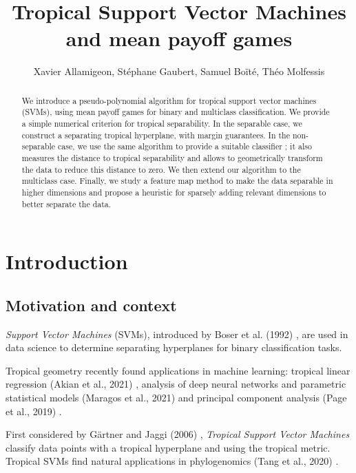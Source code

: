 \documentclass[oneside,UKenglish,a4paper]{amsart}
\numberwithin{equation}{section}
\numberwithin{figure}{section}
\theoremstyle{plain}
\theoremstyle{definition}
\theoremstyle{plain}
\theoremstyle{remark}
\theoremstyle{plain}
\theoremstyle{definition}
\theoremstyle{definition}
\begin{document}
\title{Tropical Support Vector Machines and mean payoff games}
\author{Xavier Allamigeon, Stéphane Gaubert, Samuel Boïté, Théo Molfessis}
\maketitle

\begin{abstract}
    We introduce a pseudo-polynomial algorithm for tropical support vector machines (SVMs), using mean payoff games for binary and multiclass classification. We provide a simple numerical criterion for tropical separability. In the separable case, we construct a separating tropical hyperplane, with margin guarantees. In the non-separable case, we use the same algorithm to provide a suitable classifier ; it also measures the distance to tropical separability and allows to geometrically transform the data to reduce this distance to zero. We then extend our algorithm to the multiclass case. Finally, we study a feature map method to make the data separable in higher dimensions and propose a heuristic for sparsely adding relevant dimensions to better separate the data. 
\end{abstract}


\section{Introduction}

\subsection*{Motivation and context}
\emph{Support Vector Machines} (SVMs), introduced by Boser et al. (1992) \cite{Boser92}, are used in data science to determine separating hyperplanes for binary classification tasks.

Tropical geometry recently found applications in machine learning: tropical linear regression (Akian et al., 2021) \cite{Akian2021TropicalLR}, analysis of deep neural networks and parametric statistical models (Maragos et al., 2021) \cite{Vasileios2021} and principal component analysis (Page et al., 2019) \cite{YoshidaPCA2019}.

First considered by Gärtner and Jaggi (2006) \cite{Gartner2006}, \emph{Tropical Support Vector Machines} classify data points with a tropical hyperplane and using the tropical metric. Tropical SVMs find natural applications in phylogenomics (Tang et al., 2020) \cite{Tang2020}.
\end{document}
